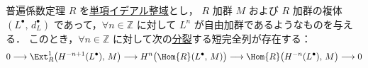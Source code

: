 \documentclass[algtopo_main]{subfiles}
\begin{document}
\begin{mycol}[label=thm:u-coeff-Ext]{普遍係数定理}
    $R$ を\hyperref[def:PID]{単項イデアル整域}とし，
    $R$ 加群 $M$ および $R$ 加群の複体 $(L^\bullet,\, d_L^\bullet)$ であって，$\forall n \in \mathbb{Z}$ に対して $L^n$ が自由加群であるようなものを与える．
    このとき，$\forall n \in \mathbb{Z}$ に対して次の\hyperref[def:split]{分裂}する短完全列が存在する：
        \begin{align}
            \label{SES:u-coeff-Ext}
            0 \lto \Ext_R^1\bigl(H^{-n+1}(L^\bullet),\, M\bigr) \lto H^n\bigl(\Hom{R} (L^\bullet,\, M)\bigr) \lto \Hom{R} \bigl( H^{-n}(L^\bullet),\, M \bigr)  \lto 0
        \end{align}
\end{mycol}
\end{document}

